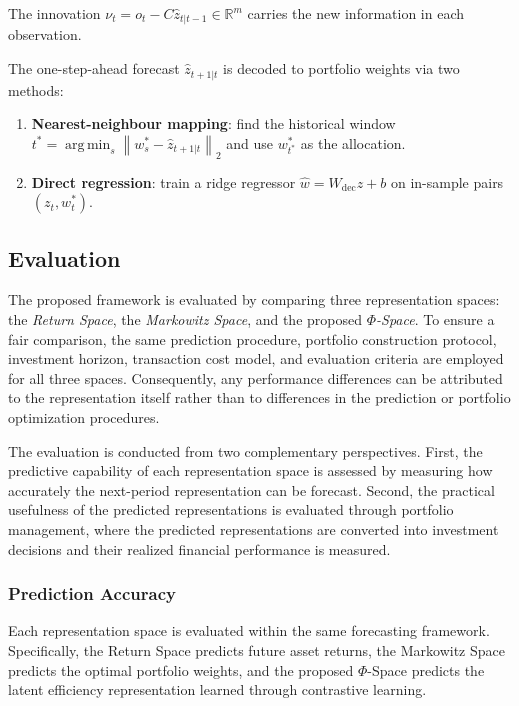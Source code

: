 \documentclass[preprint,12pt]{elsarticle}
\theoremstyle{plain}
\theoremstyle{definition}
\newcommand{\R}{\mathbb{R}}
\newcommand{\norm}[1]{\left\|#1\right\|}
\DeclareMathOperator*{\argmin}{arg\,min}
\begin{document}
The innovation $\nu_t = o_t - C\hat{z}_{t|t-1} \in \R^m$ carries the
new information in each observation.

The one-step-ahead forecast $\hat{z}_{t+1|t}$ is decoded to portfolio weights
via two methods:

\begin{enumerate}
	\item \textbf{Nearest-neighbour mapping}: find the historical window
	$t^* = \argmin_s \norm{w_s^* - \hat{z}_{t+1|t}}_2$ and use $w_{t^*}^*$
	as the allocation.
	\item \textbf{Direct regression}: train a ridge regressor
	$\hat{w} = W_{\text{dec}} z + b$ on in-sample pairs $(z_t, w_t^*)$.
\end{enumerate}



\subsection{Evaluation}
\label{subsec:stationarity_measure}
The proposed framework is evaluated by comparing three representation spaces: the \emph{Return Space}, the \emph{Markowitz Space}, and the proposed \emph{$\Phi$-Space}. To ensure a fair comparison, the same prediction procedure, portfolio construction protocol, investment horizon, transaction cost model, and evaluation criteria are employed for all three spaces. Consequently, any performance differences can be attributed to the representation itself rather than to differences in the prediction or portfolio optimization procedures.

The evaluation is conducted from two complementary perspectives. First, the predictive capability of each representation space is assessed by measuring how accurately the next-period representation can be forecast. Second, the practical usefulness of the predicted representations is evaluated through portfolio management, where the predicted representations are converted into investment decisions and their realized financial performance is measured.

\subsubsection{Prediction Accuracy}

Each representation space is evaluated within the same forecasting framework. Specifically, the Return Space predicts future asset returns, the Markowitz Space predicts the optimal portfolio weights, and the proposed $\Phi$-Space predicts the latent efficiency representation learned through contrastive learning.
\end{document}
